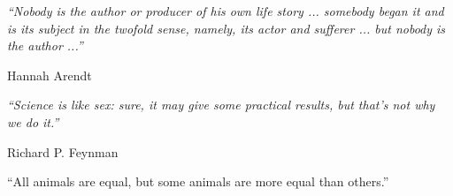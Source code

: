 \newpage 

\begin{center}
\end{center}
\vspace{\fill}

\textit{“Nobody is the author or producer of his own life story ... somebody began it and is its subject in the twofold sense, namely, its actor and sufferer ... but nobody is the author ...”}

Hannah Arendt


\textit{“Science is like sex: sure, it may give some practical results, but that's not why we do it.”}

Richard P. Feynman


“All animals are equal, but some animals are more equal than others.”

\vspace{\fill}

\newpage